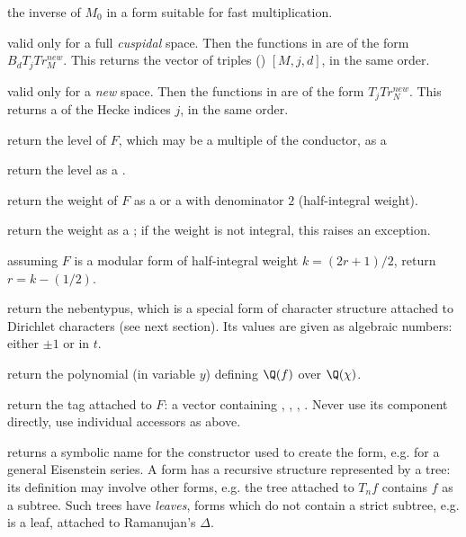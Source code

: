  the inverse of $M_0$ in a form suitable for fast
multiplication.

 valid only for a full
\emph{cuspidal} space. Then the functions in  are
of the form $B_d T_j Tr^{new}_M$. This returns the vector of triples
() $[M,j,d]$, in the same order.

 valid only for a \emph{new} space. Then
the functions in  are of the form $T_j Tr^{new}_N$. This
returns a  of the Hecke indices $j$, in the same order.


 return the level of $F$, which may be a multiple of
the conductor, as a 

 return the level as a .

 return the weight of $F$ as a 
or a  with denominator $2$ (half-integral weight).

 return the weight as a ; if the weight is
not integral, this raises an exception.

 assuming $F$ is a modular form of half-integral
weight $k = (2r+1)/2$, return $r = k - (1/2)$.

 return the nebentypus, which is a special form of
character structure attached to Dirichlet characters (see next section). Its
values are given as algebraic numbers: either $\pm1$ or 
in $t$.

 return the polynomial (in variable $y$)
 defining $\Q(f)$ over $\Q(\chi)$.

 return the tag attached to $F$: a vector containing
, , , . Never use its component directly,
use individual accessors as above.

 returns a symbolic name for the constructor
used to create the form, e.g.  for a general Eisenstein
series. A form has a recursive structure represented by a tree: its
definition may involve other forms, e.g. the tree attached to $T_n f$
contains $f$ as a subtree. Such trees have \emph{leaves}, forms
which do not contain a strict subtree, e.g.  is a leaf,
attached to Ramanujan's $\Delta$.

